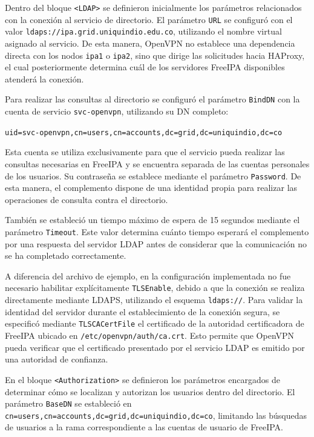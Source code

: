 Dentro del bloque \texttt{<LDAP>} se definieron inicialmente los parámetros relacionados con la conexión al servicio de directorio. El parámetro \texttt{URL} se configuró con el valor \nolinkurl{ldaps://ipa.grid.uniquindio.edu.co}, utilizando el nombre virtual asignado al servicio. De esta manera, OpenVPN no establece una dependencia directa con los nodos \texttt{ipa1} o \texttt{ipa2}, sino que dirige las solicitudes hacia HAProxy, el cual posteriormente determina cuál de los servidores FreeIPA disponibles atenderá la conexión.

Para realizar las consultas al directorio se configuró el parámetro \texttt{BindDN} con la cuenta de servicio \texttt{svc-openvpn}, utilizando su \ac{DN} completo:

\begin{center}
	\texttt{uid=svc-openvpn,cn=users,cn=accounts,dc=grid,dc=uniquindio,dc=co}
\end{center}

Esta cuenta se utiliza exclusivamente para que el servicio pueda realizar las consultas necesarias en FreeIPA y se encuentra separada de las cuentas personales de los usuarios. Su contraseña se establece mediante el parámetro \texttt{Password}. De esta manera, el complemento dispone de una identidad propia para realizar las operaciones de consulta contra el directorio.

También se estableció un tiempo máximo de espera de 15 segundos mediante el parámetro \texttt{Timeout}. Este valor determina cuánto tiempo esperará el complemento por una respuesta del servidor \ac{LDAP} antes de considerar que la comunicación no se ha completado correctamente.

A diferencia del archivo de ejemplo, en la configuración implementada no fue necesario habilitar explícitamente \texttt{TLSEnable}, debido a que la conexión se realiza directamente mediante \ac{LDAPS}, utilizando el esquema \texttt{ldaps://}. Para validar la identidad del servidor durante el establecimiento de la conexión segura, se especificó mediante \texttt{TLSCACertFile} el certificado de la autoridad certificadora de FreeIPA ubicado en \texttt{/etc/openvpn/auth/ca.crt}. Esto permite que OpenVPN pueda verificar que el certificado presentado por el servicio \ac{LDAP} es emitido por una autoridad de confianza.

En el bloque \texttt{<Authorization>} se definieron los parámetros encargados de determinar cómo se localizan y autorizan los usuarios dentro del directorio. El parámetro \texttt{BaseDN} se estableció en \texttt{cn=users,cn=accounts,dc=grid,dc=uniquindio,dc=co}, limitando las búsquedas de usuarios a la rama correspondiente a las cuentas de usuario de FreeIPA.

